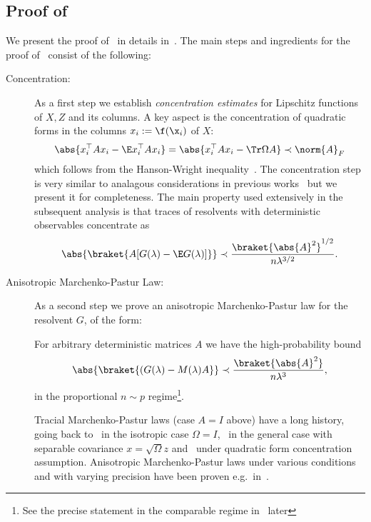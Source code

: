\subsection{Proof of~}
We present the proof of~ in details in~. The main steps and ingredients for the proof of~ consist of the following:
\begin{description}
    \item[Concentration:] As a first step we establish \emph{concentration estimates} for Lipschitz functions of $X,Z$ and its columns. A key aspect is the concentration of quadratic forms in the columns $x_i:=\f(\x_i)$ of $X$:
        \begin{equation*}
            \abs{x_i^\top A x_i - \E x_i^\top A x_i}= \abs{x_i^\top A x_i-\Tr \Omega A}\prec \norm{A}_F
        \end{equation*}
        which follows from the Hanson-Wright inequality~\cite{1409.8457}. The concentration step is very similar to analagous considerations in previous works~\cite{chouard2022quantitative,1702.05419} but we present it for completeness. The main property used extensively in the subsequent analysis is that traces of resolvents with deterministic observables concentrate as
        \begin{equation}\label{concentration AG}
            \abs{\braket{A[G(\lambda)-\E G(\lambda)]}} \prec \frac{\braket{\abs{A}^2}^{1/2}}{n\lambda^{3/2}}.
        \end{equation}
    \item[Anisotropic Marchenko-Pastur Law:] 
    As a second step we prove an anisotropic Marchenko-Pastur law for the resolvent $G$, of the form:
        \begin{theorem}\label{thm MP}
            For arbitrary deterministic matrices $A$ we have the high-probability bound
            \begin{equation}\label{mp main eq}
                \abs{\braket{(G(\lambda)-M(\lambda)A}} \prec \frac{\braket{\abs{A}^2}}{n\lambda^3},
            \end{equation}
            in the proportional $n\sim p$ regime\footnote{See the precise statement in the comparable regime in~ later}.
        \end{theorem}
        \begin{remark}
            Tracial Marchenko-Pastur laws (case $A=I$ above) have a long history, going back to~\cite{marcenkopastur} in the isotropic case $\Omega=I$,~\cite{SILVERSTEIN1995331} in the general case with separable covariance $x=\sqrt{\Omega}z$ and~\cite{baizhou} under quadratic form concentration assumption. Anisotropic Marchenko-Pastur laws under various conditions and with varying precision have been proven e.g.\ in~\cite{RUBIO2011592,chouard2022quantitative,louart2018random,10.1007/s00440-016-0730-4}.

\end{remark}
\end{description}
